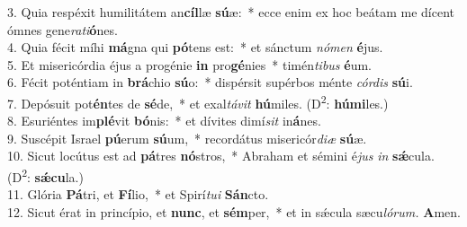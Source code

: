 3. Quia respéxit humilitátem an\textbf{cíl}læ \textbf{sú}æ: * ecce enim ex hoc beátam me dícent ómnes gene\textit{rati}\textbf{ó}nes.\\
4. Quia fécit míhi \textbf{má}gna qui \textbf{pó}tens est: * et sánctum \textit{nómen} \textbf{é}jus.\\
5. Et misericórdia éjus a progénie \textbf{in} pro\textbf{gé}nies * timén\textit{tibus} \textbf{é}um.\\
6. Fécit poténtiam in \textbf{brá}chio \textbf{sú}o: * dispérsit supérbos ménte \textit{córdis} \textbf{sú}i.\\
7. Depósuit pot\textbf{én}tes de \textbf{sé}de, * et exal\textit{távit} \textbf{hú}miles. (D\textsuperscript{2}: \textbf{húmi}les.)\\
8. Esuriéntes im\textbf{plé}vit \textbf{bó}nis: * et dívites dimí\textit{sit} in\textbf{á}nes.\\
9. Suscépit Israel \textbf{pú}erum \textbf{sú}um, * recordátus misericór\textit{diæ} \textbf{sú}æ.\\
10. Sicut locútus est ad \textbf{pá}tres \textbf{nó}stros, * Abraham et sémini é\textit{jus} \textit{in} \textbf{sǽ}cula. (D\textsuperscript{2}: \textbf{sǽcu}la.)\\
11. Glória \textbf{Pá}tri, et \textbf{Fí}lio, * et Spirí\textit{tui} \textbf{Sán}cto.\\
12. Sicut érat in princípio, et \textbf{nunc}, et \textbf{sém}per, * et in sǽcula sæcu\textit{lórum.} \textbf{A}men.